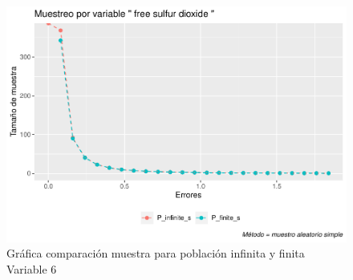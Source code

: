 \documentclass[
]{article}
\begin{document}
\begin{figure}
\centering
\includegraphics{1_examen_solucion_files/figure-latex/grafica va6-1.pdf}
\caption{Gráfica comparación muestra para población infinita y finita
Variable 6}
\end{figure}
\end{document}
